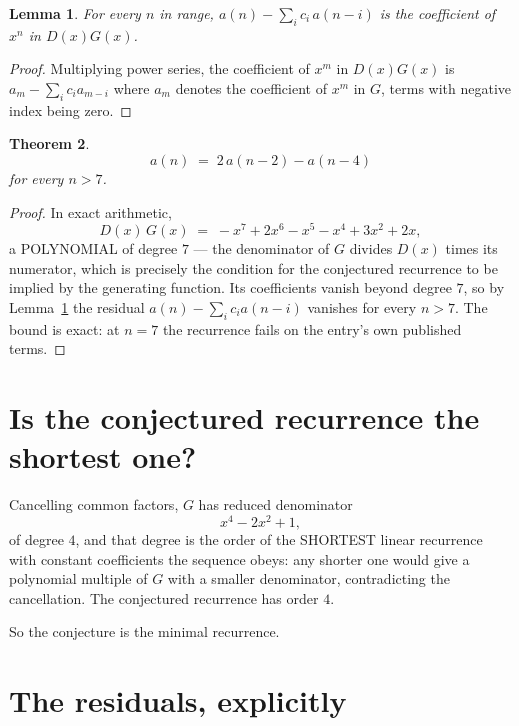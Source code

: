 \documentclass[11pt,a4paper]{article}
\theoremstyle{plain}
\newtheorem{theorem}{Theorem}
\newtheorem{lemma}[theorem]{Lemma}
\theoremstyle{definition}
\begin{document}
\begin{lemma}\label{lem:key}
For every $n$ in range, $a(n)-\sum_i c_i\,a(n-i)$ is the coefficient of $x^{n}$ in
$D(x)G(x)$.
\end{lemma}

\begin{proof}
Multiplying power series, the coefficient of $x^{m}$ in $D(x)G(x)$ is
$a_m-\sum_i c_i a_{m-i}$ where $a_m$ denotes the coefficient of $x^{m}$ in $G$, terms with
negative index being zero.
\end{proof}

\begin{theorem}
\[
a(n)\;=\;2\,a(n-2) - a(n-4)
\]
for every $n>7$.
\end{theorem}

\begin{proof}
In exact arithmetic,
\[
D(x)\,G(x)\;=\;- x^{7} + 2 x^{6} - x^{5} - x^{4} + 3 x^{2} + 2 x,
\]
a POLYNOMIAL of degree $7$ --- the denominator of $G$ divides $D(x)$ times its numerator,
which is precisely the condition for the conjectured recurrence to be implied by the
generating function. Its coefficients vanish beyond degree $7$, so by
Lemma~\ref{lem:key} the residual $a(n)-\sum_ic_ia(n-i)$ vanishes for every
$n>7$. The bound is exact: at $n=7$ the recurrence fails on the entry's own published terms.
\end{proof}

\section{Is the conjectured recurrence the shortest one?}

Cancelling common factors, $G$ has reduced denominator
\[
x^{4} - 2 x^{2} + 1,
\]
of degree $4$, and that degree is the order of the SHORTEST linear recurrence with
constant coefficients the sequence obeys: any shorter one would give a polynomial multiple of
$G$ with a smaller denominator, contradicting the cancellation. The conjectured recurrence has
order $4$.

So the conjecture is the minimal recurrence.

\section{The residuals, explicitly}
\end{document}
